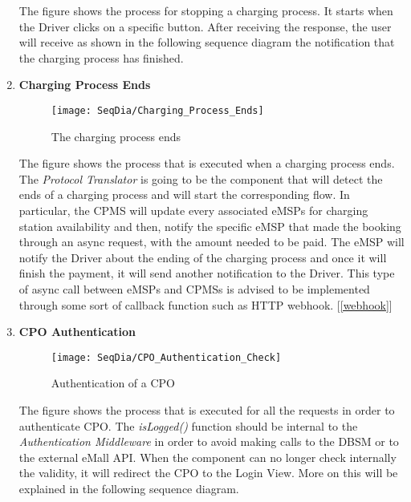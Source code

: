 \begin{enumerate}
        The figure shows the process for stopping a charging process. It starts when the Driver clicks on a specific button. After receiving the response, the user will receive as shown in the following sequence diagram the notification that the charging process has finished.
        \newpage
        \item \textbf{Charging Process Ends}
        \begin{figure}[H]
            \begin{center}
            \texttt{[image: SeqDia/Charging\_Process\_Ends]}
            \caption{The charging process ends}
            \label{fig:EndCharge}
            \end{center}
        \end{figure}
        The figure shows the process that is executed when a charging process ends. The \textit{Protocol Translator} is going to be the component that will detect the ends of a charging process and will start the corresponding flow. In particular, the CPMS will update every associated eMSPs for charging station availability and then, notify the specific eMSP that made the booking through an async request, with the amount needed to be paid. The eMSP will notify the Driver about the ending of the charging process and once it will finish the payment, it will send another notification to the Driver. This type of async call between eMSPs and CPMSs is advised to be implemented through some sort of callback function such as HTTP webhook. [\ref{webhook}]
        \newpage
        \item \textbf{CPO Authentication}
        \begin{figure}[H]
            \begin{center}
            \texttt{[image: SeqDia/CPO\_Authentication\_Check]}
            \caption{Authentication of a CPO}
            \label{fig:CPOAuthentication}
            \end{center}
        \end{figure}
        The figure shows the process that is executed for all the requests in order to authenticate CPO. The \textit{isLogged()} function should be internal to the \textit{Authentication Middleware} in order to avoid making calls to the DBSM or to the external eMall API. When the component can no longer check internally the validity, it will redirect the CPO to the Login View. More on this will be explained in the following sequence diagram.

\end{enumerate}
